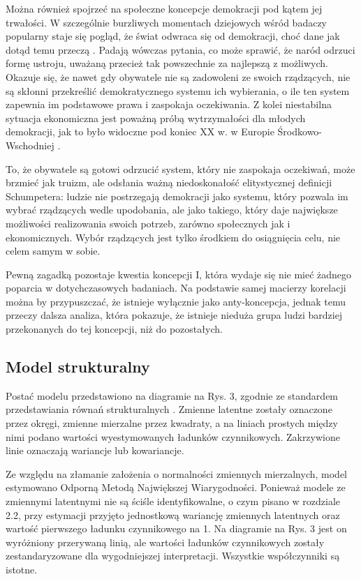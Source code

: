 \documentclass[12pt]{article}
\begin{document}
Można również spojrzeć na społeczne koncepcje demokracji pod kątem jej trwałości. W szczególnie burzliwych momentach dziejowych wśród badaczy popularny staje się pogląd, że świat odwraca się od demokracji, choć dane jak dotąd temu przeczą \citep{Doorenspleet}. Padają wówczas pytania, co może sprawić, że naród odrzuci formę ustroju, uważaną przecież tak powszechnie za najlepszą z możliwych. Okazuje się, że nawet gdy obywatele nie są zadowoleni ze swoich rządzących, nie są skłonni przekreślić demokratycznego systemu ich wybierania, o ile ten system zapewnia im podstawowe prawa i zaspokaja oczekiwania. Z kolei niestabilna sytuacja ekonomiczna jest poważną próbą wytrzymałości dla młodych demokracji, jak to było widoczne pod koniec XX w. w Europie Środkowo-Wschodniej \citep{Klingemann}.

To, że obywatele są gotowi odrzucić system, który nie zaspokaja oczekiwań, może brzmieć jak truizm, ale odsłania ważną niedoskonałość elitystycznej definicji Schumpetera: ludzie nie postrzegają demokracji jako systemu, który pozwala im wybrać rządzących wedle upodobania, ale jako takiego, który daje największe możliwości realizowania swoich potrzeb, zarówno społecznych jak i ekonomicznych. Wybór rządzących jest tylko środkiem do osiągnięcia celu, nie celem samym w sobie.

Pewną zagadką pozostaje kwestia koncepcji I, która wydaje się nie mieć żadnego poparcia w dotychczasowych badaniach. Na podstawie samej macierzy korelacji można by przypuszczać, że istnieje wyłącznie jako anty-koncepcja, jednak temu przeczy dalsza analiza, która pokazuje, że istnieje nieduża grupa ludzi bardziej przekonanych do tej koncepcji, niż do pozostałych.

\hypertarget{model-strukturalny}{%
\subsection{Model strukturalny}\label{model-strukturalny}}

Postać modelu przedstawiono na diagramie na Rys. 3, zgodnie ze standardem przedstawiania równań strukturalnych \citep{Everitt}. Zmienne latentne zostały oznaczone przez okręgi, zmienne mierzalne przez kwadraty, a na liniach prostych między nimi podano wartości wyestymowanych ładunków czynnikowych. Zakrzywione linie oznaczają wariancje lub kowariancje.

Ze względu na złamanie założenia o normalności zmiennych mierzalnych, model estymowano Odporną Metodą Największej Wiarygodności. Ponieważ modele ze zmiennymi latentnymi nie są ściśle identyfikowalne, o czym pisano w rozdziale 2.2, przy estymacji przyjęto jednostkową wariancję zmiennych latentnych oraz wartość pierwszego ładunku czynnikowego na 1. Na diagramie na Rys. 3 jest on wyróżniony przerywaną linią, ale wartości ładunków czynnikowych zostały zestandaryzowane dla wygodniejszej interpretacji. Wszystkie współczynniki są istotne.
\end{document}
